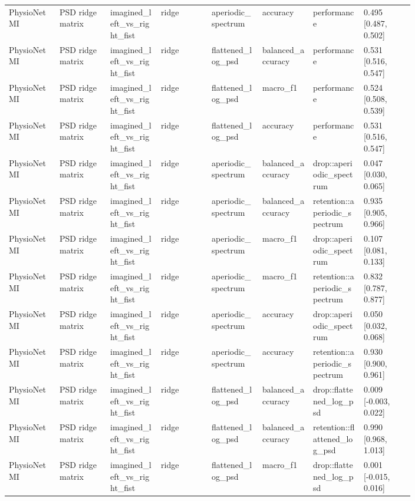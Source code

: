 \begin{longtable}{p{0.10\linewidth}p{0.10\linewidth}p{0.10\linewidth}p{0.10\linewidth}p{0.10\linewidth}p{0.10\linewidth}p{0.10\linewidth}p{0.10\linewidth}}
PhysioNet MI & PSD ridge matrix & imagined\_left\_vs\_right\_fist & ridge & aperiodic\_spectrum & accuracy & performance & 0.495 [0.487, 0.502]\\
PhysioNet MI & PSD ridge matrix & imagined\_left\_vs\_right\_fist & ridge & flattened\_log\_psd & balanced\_accuracy & performance & 0.531 [0.516, 0.547]\\
PhysioNet MI & PSD ridge matrix & imagined\_left\_vs\_right\_fist & ridge & flattened\_log\_psd & macro\_f1 & performance & 0.524 [0.508, 0.539]\\
PhysioNet MI & PSD ridge matrix & imagined\_left\_vs\_right\_fist & ridge & flattened\_log\_psd & accuracy & performance & 0.531 [0.516, 0.547]\\
PhysioNet MI & PSD ridge matrix & imagined\_left\_vs\_right\_fist & ridge & aperiodic\_spectrum & balanced\_accuracy & drop::aperiodic\_spectrum & 0.047 [0.030, 0.065]\\
PhysioNet MI & PSD ridge matrix & imagined\_left\_vs\_right\_fist & ridge & aperiodic\_spectrum & balanced\_accuracy & retention::aperiodic\_spectrum & 0.935 [0.905, 0.966]\\
PhysioNet MI & PSD ridge matrix & imagined\_left\_vs\_right\_fist & ridge & aperiodic\_spectrum & macro\_f1 & drop::aperiodic\_spectrum & 0.107 [0.081, 0.133]\\
PhysioNet MI & PSD ridge matrix & imagined\_left\_vs\_right\_fist & ridge & aperiodic\_spectrum & macro\_f1 & retention::aperiodic\_spectrum & 0.832 [0.787, 0.877]\\
PhysioNet MI & PSD ridge matrix & imagined\_left\_vs\_right\_fist & ridge & aperiodic\_spectrum & accuracy & drop::aperiodic\_spectrum & 0.050 [0.032, 0.068]\\
PhysioNet MI & PSD ridge matrix & imagined\_left\_vs\_right\_fist & ridge & aperiodic\_spectrum & accuracy & retention::aperiodic\_spectrum & 0.930 [0.900, 0.961]\\
PhysioNet MI & PSD ridge matrix & imagined\_left\_vs\_right\_fist & ridge & flattened\_log\_psd & balanced\_accuracy & drop::flattened\_log\_psd & 0.009 [-0.003, 0.022]\\
PhysioNet MI & PSD ridge matrix & imagined\_left\_vs\_right\_fist & ridge & flattened\_log\_psd & balanced\_accuracy & retention::flattened\_log\_psd & 0.990 [0.968, 1.013]\\
PhysioNet MI & PSD ridge matrix & imagined\_left\_vs\_right\_fist & ridge & flattened\_log\_psd & macro\_f1 & drop::flattened\_log\_psd & 0.001 [-0.015, 0.016]\\

\end{longtable}
